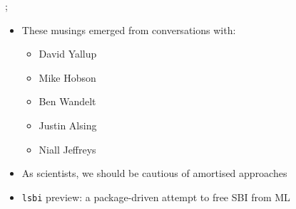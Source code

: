 \documentclass[aspectratio=169]{beamer}
\begin{document}
\begin{frame}
{    };
    \begin{itemize}
        \item These musings emerged from conversations with:
            \begin{itemize}
                \item David Yallup
                \item Mike Hobson
                \item Ben Wandelt
                \item Justin Alsing
                \item Niall Jeffreys
            \end{itemize}
        \item As scientists, we should be cautious of amortised approaches
        \item \texttt{lsbi} preview: a package-driven attempt to free SBI from ML
    \end{itemize}
\end{frame}
\end{document}
